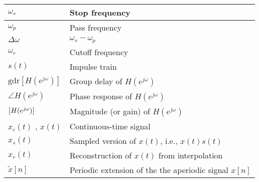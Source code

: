 \documentclass{article}
\begin{document}
\begin{xltabular}{\textwidth}{XX}
    \(\omega_s\) & Stop frequency \cite{ingleDigitalSignalProcessing2000} \\ \hline
    \(\omega_p\) & Pass frequency \cite{ingleDigitalSignalProcessing2000} \\ \hline
    \(\Delta \omega\) & \(\omega_s - \omega_p\) \cite{ingleDigitalSignalProcessing2000} \\ \hline
    \(\omega_c\) & Cutoff frequency \cite{ingleDigitalSignalProcessing2000} \\ \hline
    \(s(t)\) & Impulse train \\ \hline
    \(\textrm{gdr}\left[ H (e^{j\omega}) \right]\) \cite{oppenheimDiscreteTimeSignalProcessing2009} & Group delay of \(H (e^{j\omega})\) \\ \hline
    \(\angle H (e^{j\omega})\) \cite{oppenheimDiscreteTimeSignalProcessing2009} & Phase response of \(H (e^{j\omega})\) \\ \hline
    \(\abs{H (e^{j\omega})}\) \cite{oppenheimDiscreteTimeSignalProcessing2009} & Magnitude (or gain) of \(H (e^{j\omega})\) \\ \hline
    \(x_c(t)\) \cite{oppenheimDiscreteTimeSignalProcessing2009}, \(x(t)\) & Continuous-time signal \\ \hline
    \(x_s(t)\) & Sampled version of \(x(t)\), i.e., \(x(t)s(t)\) \\ \hline
    \(x_r(t)\) & Reconstruction of \(x(t)\) from interpolation \\ \hline
    \(\tilde{x}[n]\) & Periodic extension of the the aperiodic signal \(x[n]\) \\ \hline
\end{xltabular}
\end{document}
